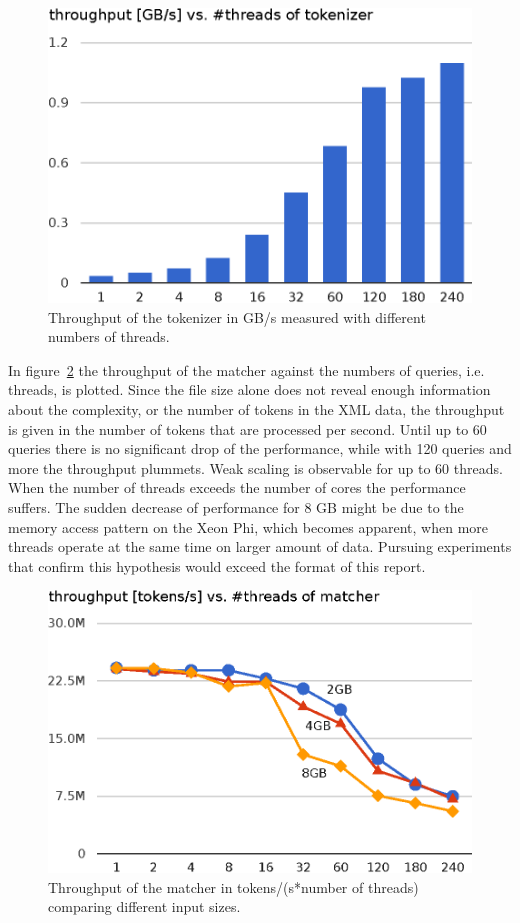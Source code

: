 \begin{figure}[h]\centering
  \includegraphics[scale=.66]{img/tokenizer_throughput_2.eps}
  \caption{Throughput of the tokenizer in GB/s measured with different numbers of threads.
  \label{tokenizer_throughput}}
\end{figure}

In figure~\ref{matcher_throughput} the throughput of the matcher against the numbers of queries, i.e. threads, is plotted. Since the file size alone does not reveal enough information about the complexity, or the number of tokens in the XML data, the throughput is given in the number of tokens that are processed per second. Until up to 60 queries there is no significant drop of the performance, while with 120 queries and more the throughput plummets. Weak scaling is observable for up to 60 threads. When the number of threads exceeds the number of cores the performance suffers. The sudden decrease of performance for 8 GB might be due to the memory access pattern on the Xeon Phi, which becomes apparent, when more threads operate at the same time on larger amount of data. Pursuing experiments that confirm this hypothesis would exceed the format of this report. 

\begin{figure}[h]\centering
  \includegraphics[scale=.66]{img/matcher_throughput_2.eps}
  \caption{Throughput of the matcher in tokens/(s*number of threads) comparing different input sizes. \label{matcher_throughput}}
\end{figure}

